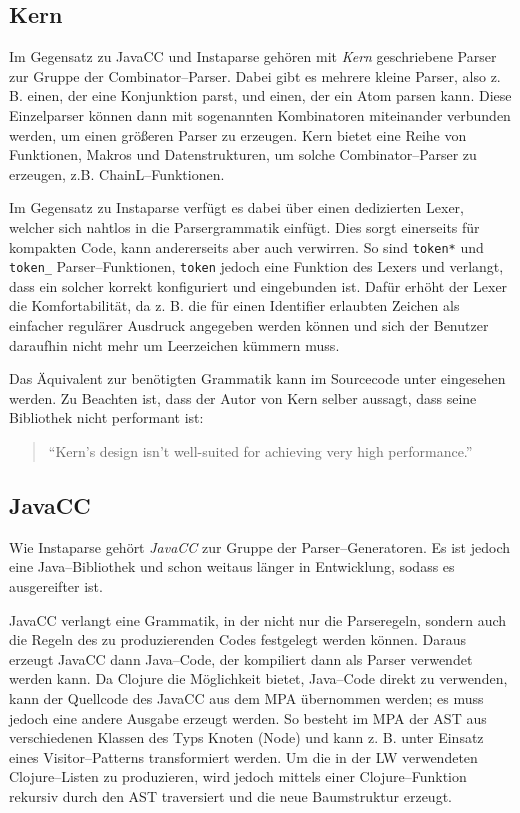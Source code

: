 \documentclass[ngerman,a4paper,abstracton,open=right,twoside=false,toc=listofnumbered,bibtotocnumbered]{scrreprt}
\begin{document}
\subsection{Kern}

Im Gegensatz zu JavaCC und Instaparse gehören mit \emph{Kern} geschriebene Parser zur Gruppe der Combinator--Parser. Dabei gibt es mehrere \glqq{}kleine\grqq{} Parser, also z. B. einen, der eine Konjunktion parst, und einen, der ein Atom parsen kann. Diese Einzelparser können dann mit sogenannten Kombinatoren miteinander verbunden werden, um einen größeren Parser zu erzeugen. Kern bietet eine Reihe von Funktionen, Makros und Datenstrukturen, um solche Combinator--Parser zu erzeugen, z.B. ChainL--Funktionen.

Im Gegensatz zu Instaparse verfügt es dabei über einen dedizierten Lexer, welcher sich nahtlos in die Parsergrammatik einfügt. Dies sorgt einerseits für kompakten Code, kann andererseits aber auch verwirren. So sind \lstinline|token*| und \lstinline|token_| Parser--Funktionen, \lstinline|token| jedoch eine Funktion des Lexers und verlangt, dass ein solcher korrekt konfiguriert und eingebunden ist. Dafür erhöht der Lexer die Komfortabilität, da z. B. die für einen Identifier erlaubten Zeichen als einfacher regulärer Ausdruck angegeben werden können und sich der Benutzer daraufhin nicht mehr um Leerzeichen kümmern muss.

Das Äquivalent zur benötigten Grammatik kann im Sourcecode unter \cite{lw} eingesehen werden. Zu Beachten ist, dass der Autor von Kern selber aussagt, dass seine Bibliothek nicht performant ist: 

\begin{quote}
	``Kern's design isn't well-suited for achieving very high performance.'' \cite{kern}
\end{quote}

\subsection{JavaCC}\label{JavaCC}

Wie Instaparse gehört \emph{JavaCC} zur Gruppe der Parser--Generatoren. Es ist jedoch eine Java--Bibliothek und schon weitaus länger in Entwicklung, sodass es ausgereifter ist. \cite{javacc}

JavaCC verlangt eine Grammatik, in der nicht nur die Parseregeln, sondern auch die Regeln des zu produzierenden Codes festgelegt werden können. Daraus erzeugt JavaCC dann Java--Code, der kompiliert dann als Parser verwendet werden kann. Da Clojure die Möglichkeit bietet, Java--Code direkt zu verwenden, kann der Quellcode des JavaCC aus dem MPA übernommen werden; es muss jedoch eine andere Ausgabe erzeugt werden. So besteht im MPA der AST aus verschiedenen Klassen des Typs \glqq{}Knoten\grqq{} (Node) und kann z. B. unter Einsatz eines Visitor--Patterns transformiert werden. Um die in der LW verwendeten Clojure--Listen zu produzieren, wird jedoch mittels einer Clojure--Funktion rekursiv durch den AST traversiert und die neue Baumstruktur erzeugt.
\end{document}
